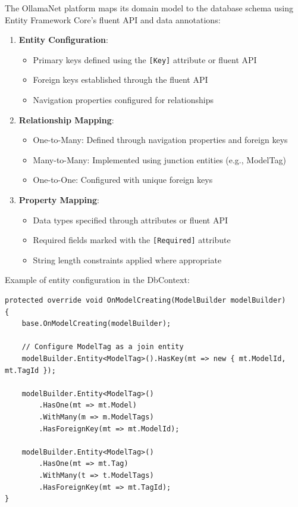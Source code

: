 The OllamaNet platform maps its domain model to the database schema using Entity Framework Core's fluent API and data annotations:

\begin{enumerate}
   \item \textbf{Entity Configuration}:
   \begin{itemize}
      \item Primary keys defined using the \texttt{[Key]} attribute or fluent API
      \item Foreign keys established through the fluent API
      \item Navigation properties configured for relationships
   \end{itemize}

   \item \textbf{Relationship Mapping}:
   \begin{itemize}
      \item One-to-Many: Defined through navigation properties and foreign keys
      \item Many-to-Many: Implemented using junction entities (e.g., ModelTag)
      \item One-to-One: Configured with unique foreign keys
   \end{itemize}

   \item \textbf{Property Mapping}:
   \begin{itemize}
      \item Data types specified through attributes or fluent API
      \item Required fields marked with the \texttt{[Required]} attribute
      \item String length constraints applied where appropriate
   \end{itemize}
\end{enumerate}

Example of entity configuration in the DbContext:

\begin{verbatim}
protected override void OnModelCreating(ModelBuilder modelBuilder)
{
    base.OnModelCreating(modelBuilder);

    // Configure ModelTag as a join entity
    modelBuilder.Entity<ModelTag>().HasKey(mt => new { mt.ModelId, mt.TagId });

    modelBuilder.Entity<ModelTag>()
        .HasOne(mt => mt.Model)
        .WithMany(m => m.ModelTags)
        .HasForeignKey(mt => mt.ModelId);

    modelBuilder.Entity<ModelTag>()
        .HasOne(mt => mt.Tag)
        .WithMany(t => t.ModelTags)
        .HasForeignKey(mt => mt.TagId);
}
\end{verbatim}

